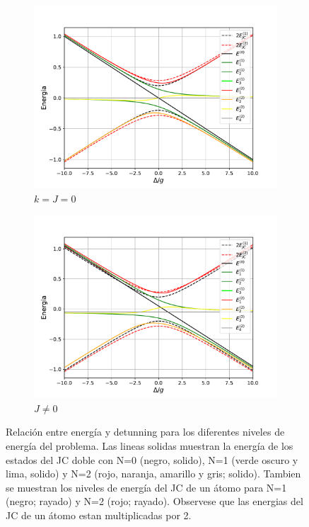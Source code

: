 \begin{figure}
    \centering
    \begin{subfigure}[h]{0.49\textwidth}
        \centering
        \includegraphics[width=\textwidth]{figuras/ch4/relacion_energia_detunning1.pdf}
        \caption{$k=J=0$}
        \label{fig:relación energia detunning 1}
    \end{subfigure}
    \hfill
    \begin{subfigure}[h]{0.49\textwidth}
        \centering
        \includegraphics[width=\textwidth]{figuras/ch4/relacion_energia_detunning2.pdf}
        \caption{$J\neq 0$}
        \label{fig:relación energia detunning 2}
    \end{subfigure}
       \caption{Relación entre energía y detunning para los diferentes niveles de energía del problema. Las lineas solidas muestran la energía de los estados del JC doble con N=0 (negro, solido), N=1 (verde oscuro y lima, solido) y N=2 (rojo, naranja, amarillo y gris; solido). Tambien se muestran los niveles de energía del JC de un átomo para N=1 (negro; rayado) y N=2 (rojo; rayado). Observese que las energias del JC de un átomo estan multiplicadas por 2.}
       \label{fig:relación energia detunning}
\end{figure}
